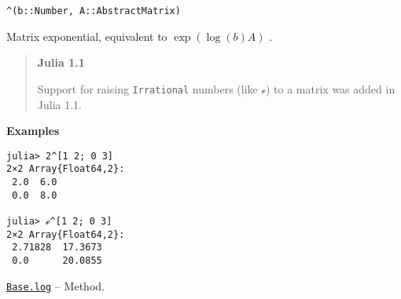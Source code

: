 \begin{adjustwidth}{2em}{0pt}


\begin{verbatim}
^(b::Number, A::AbstractMatrix)
\end{verbatim}

Matrix exponential, equivalent to  \(\exp(\log(b)A)\) .

\begin{quote}
\textbf{Julia 1.1}

Support for raising \texttt{Irrational} numbers (like \texttt{ℯ}) to a matrix was added in Julia 1.1.

\end{quote}
\textbf{Examples}


\begin{verbatim}
julia> 2^[1 2; 0 3]
2×2 Array{Float64,2}:
 2.0  6.0
 0.0  8.0

julia> ℯ^[1 2; 0 3]
2×2 Array{Float64,2}:
 2.71828  17.3673
 0.0      20.0855
\end{verbatim}



\end{adjustwidth}
\hypertarget{3808986897558314383}{} 
\hyperlink{3808986897558314383}{\texttt{Base.log}}  -- {Method.}


